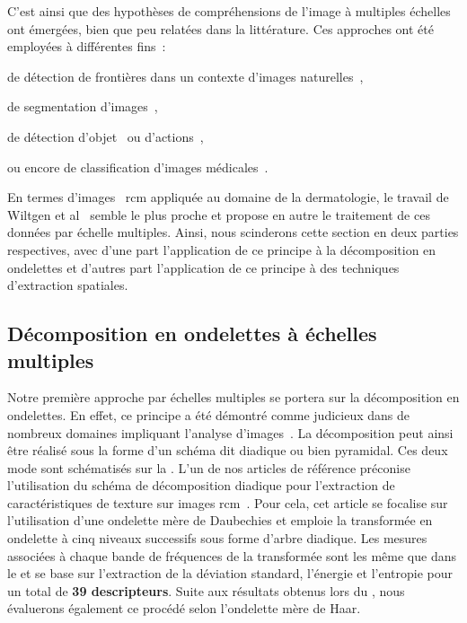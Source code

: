 C'est ainsi que des hypothèses de compréhensions de l'image à multiples échelles ont émergées, bien que peu relatées dans la littérature. Ces approches ont été employées à différentes fins~: 
\begin{inlinerate}
    \item de détection de frontières dans un contexte d'images naturelles~\cite{Ren2008},
    \item de segmentation d'images~\cite{Santos2012,Arbelaez2014},
    \item de détection d'objet~\cite{Felzenszwalb2008} ou d'actions~\cite{Pedersoli2011},
    \item ou encore de classification d'images médicales~\cite{Alsaih2016,Tang2017}.
\end{inlinerate} En termes d'images ~\gls{rcm} appliquée au domaine de la dermatologie, le travail de Wiltgen et al~\cite{Wiltgen2008} semble le plus proche et propose en autre le traitement de ces données par échelle multiples. Ainsi, nous scinderons cette section en deux parties respectives, avec d'une part l'application de ce principe à la décomposition en ondelettes et d'autres part l'application de ce principe à des techniques d'extraction spatiales.\par 

\subsection{Décomposition en ondelettes à échelles multiples}
Notre première approche par échelles multiples se portera sur la décomposition en ondelettes. En effet, ce principe a été démontré comme judicieux dans de nombreux domaines impliquant l'analyse d'images~\cite{Carvalho2004}. La décomposition peut ainsi être réalisé sous la forme d'un schéma dit diadique ou bien pyramidal. Ces deux mode sont schématisés sur la . L'un de nos articles de référence préconise l'utilisation du schéma de décomposition diadique pour l'extraction de caractéristiques de texture sur images \gls{rcm}~\cite{Wiltgen2008}. Pour cela, cet article se focalise sur l'utilisation d'une ondelette mère de Daubechies et emploie la transformée en ondelette à cinq niveaux successifs sous forme d'arbre diadique. Les mesures associées à chaque bande de fréquences de la transformée sont les même que dans le  et se base sur l'extraction de la déviation standard, l'énergie et l'entropie pour un total de \textbf{39 descripteurs}. Suite aux résultats obtenus lors du , nous évaluerons également ce procédé selon l'ondelette mère de Haar.\par

